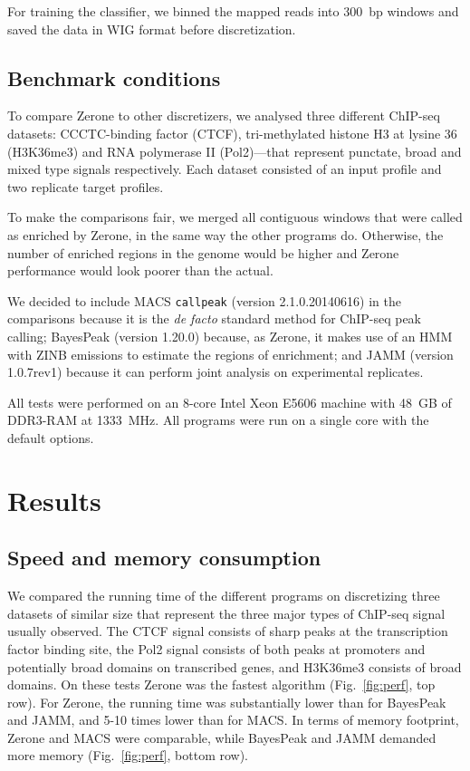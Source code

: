 \documentclass{bioinfo}
\begin{document}
\begin{methods}
For training the classifier, we binned the mapped reads into 300~bp
windows and saved the data in WIG format before discretization.

\subsection{Benchmark conditions}
To compare Zerone to other discretizers, we analysed three different
ChIP-seq datasets: CCCTC-binding factor (CTCF), tri-methylated histone H3 at
lysine 36 (H3K36me3) and RNA polymerase II (Pol2)---that represent punctate,
broad and mixed type signals respectively. Each dataset consisted of an input
profile and two replicate target profiles.

To make the comparisons fair, we merged all contiguous windows that were called
as enriched by Zerone, in the same way the other programs do. Otherwise, the
number of enriched regions in the genome would be higher and Zerone performance
would look poorer than the actual.

We decided to include MACS \texttt{callpeak} (version 2.1.0.20140616) in
the comparisons because it is the \textit{de facto} standard method
for ChIP-seq peak calling; BayesPeak (version 1.20.0) because, as Zerone,
it makes use of an HMM with ZINB emissions to estimate the regions of
enrichment; and JAMM (version 1.0.7rev1) because it can perform joint
analysis on experimental replicates.

All tests were performed on an 8-core Intel Xeon E5606 machine with 48~GB of
DDR3-RAM at 1333~MHz. All programs were run on a single core with the default
options.

\end{methods}

\section{Results}
\label{sec:results}


\subsection{Speed and memory consumption}
We compared the running time of the different programs on discretizing three
datasets of similar size that represent the three major types of ChIP-seq signal
usually observed. The CTCF signal consists of sharp peaks at the transcription
factor binding site, the Pol2 signal consists of both peaks at promoters and
potentially broad domains on transcribed genes, and H3K36me3 consists of broad
domains. On these tests Zerone was the fastest algorithm (Fig.~\ref{fig:perf},
top row). For Zerone, the running time was substantially lower than for BayesPeak
and JAMM, and 5-10 times lower than for MACS. In terms of memory footprint,
Zerone and MACS were comparable, while BayesPeak and JAMM demanded more memory
(Fig.~\ref{fig:perf}, bottom row).
\end{document}
